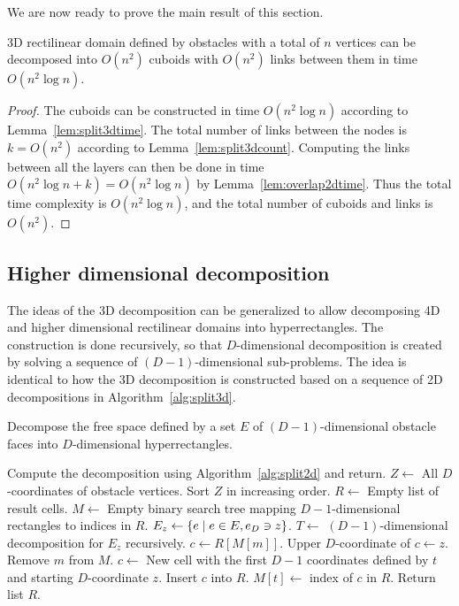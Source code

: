 \documentclass[english,gradu]{tktltiki2018}
\begin{document}
We are now ready to prove the main result of this section.

\begin{theo}\label{theo:split3dtime}3D rectilinear domain defined by obstacles with a total of $n$ vertices can be decomposed into $O(n^2)$ cuboids with $O(n^2)$ links between them in time $O(n^2\log n).$\end{theo}
\begin{proof}
The cuboids can be constructed in time $O(n^2\log n)$ according to Lemma~\ref{lem:split3dtime}.
The total number of links between the nodes is $k=O(n^2)$ according to Lemma~\ref{lem:split3dcount}.
Computing the links between all the layers can then be done in time $O(n^2\log n+k)=O(n^2\log n)$ by Lemma~\ref{lem:overlap2dtime}.
Thus the total time complexity is $O(n^2\log n)$, and the total number of cuboids and links is $O(n^2)$.
\end{proof}



\subsection{Higher dimensional decomposition}

The ideas of the 3D decomposition can be generalized to allow decomposing 4D and higher dimensional rectilinear domains into hyperrectangles.
The construction is done recursively, so that $D$-dimensional decomposition is created by solving a sequence of $(D-1)$-dimensional sub-problems.
The idea is identical to how the 3D decomposition is constructed based on a sequence of 2D decompositions in Algorithm~\ref{alg:split3d}.

\begin{alg}\label{alg:splitdd}
Decompose the free space defined by a set $E$ of $(D-1)$-dimensional obstacle faces into $D$-dimensional hyperrectangles.
\begin{algorithmic}
	\State Compute the decomposition using Algorithm~\ref{alg:split2d} and return.
\EndIf
\State $Z\gets$ All $D$-coordinates of obstacle vertices.
\State Sort $Z$ in increasing order.
\State $R\gets$ Empty list of result cells.
\State $M\gets$ Empty binary search tree mapping $D-1$-dimensional rectangles to indices in $R$.
	\State $E_z\gets\left\{e \mid e\in E, e_D\ni z\right\}$.
	\State $T\gets$ $(D-1)$-dimensional decomposition for $E_z$ recursively.
		\State $c\gets R[M[m]]$.
		\State Upper $D$-coordinate of $c\gets z$.
		\State Remove $m$ from $M$.
	\EndFor
		\State $c\gets$ New cell with the first $D-1$ coordinates defined by $t$ and starting $D$-coordinate $z$.
		\State Insert $c$ into $R$.
		\State $M[t]\gets$ index of $c$ in $R$.
	\EndFor
\EndFor
\State Return list $R$.
\end{algorithmic}
\end{alg}
\end{document}
